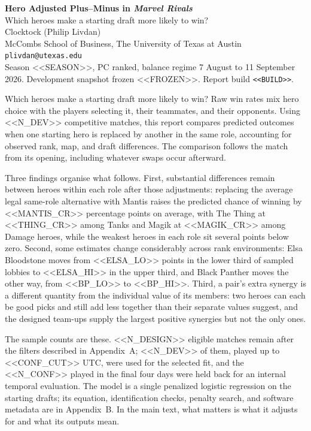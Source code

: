\documentclass[11pt]{article}
\begin{document}
\begin{center}
{\Large\bfseries Hero Adjusted Plus--Minus in \emph{Marvel Rivals}}\\[4pt]
{\large Which heroes make a starting draft more likely to win?}\\[10pt]
{\normalsize Clocktock (Philip Livdan)}\\[2pt]
{\small McCombs School of Business, The University of Texas at Austin}\\
{\small\texttt{plivdan@utexas.edu}}\\[8pt]
{\small Season <<SEASON>>, PC ranked, balance regime 7 August to 11 September 2026. Development snapshot frozen <<FROZEN>>. Report build \texttt{<<BUILD>>}.}
\end{center}

\vspace{6pt}
\noindent Which heroes make a starting draft more likely to win? Raw win rates mix hero choice with the
players selecting it, their teammates, and their opponents. Using <<N_DEV>> competitive matches, this
report compares predicted outcomes when one starting hero is replaced by another in the same role,
accounting for observed rank, map, and draft differences. The comparison follows the match from its
opening, including whatever swaps occur afterward.

Three findings organise what follows. First, substantial differences remain between heroes within each
role after those adjustments: replacing the average legal same-role alternative with Mantis raises the
predicted chance of winning by <<MANTIS_CR>> percentage points on average, with The Thing at <<THING_CR>>
among Tanks and Magik at <<MAGIK_CR>> among Damage heroes, while the weakest heroes in each role sit
several points below zero. Second, some estimates change considerably across rank environments: Elsa
Bloodstone moves from <<ELSA_LO>> points in the lower third of sampled lobbies to <<ELSA_HI>> in the
upper third, and Black Panther moves the other way, from <<BP_LO>> to <<BP_HI>>. Third, a pair's extra
synergy is a different quantity from the individual value of its members: two heroes can each be good
picks and still add less together than their separate values suggest, and the designed team-ups supply
the largest positive synergies but not the only ones.

The sample counts are these. <<N_DESIGN>> eligible matches remain after the filters described in
Appendix~A; <<N_DEV>> of them, played up to <<CONF_CUT>> UTC, were used for the selected fit, and the
<<N_CONF>> played in the final four days were held back for an internal temporal evaluation. The model is a
single penalized logistic regression on the starting drafts; its equation, identification checks,
penalty search, and software metadata are in Appendix~B. In the main text, what matters is what it
adjusts for and what its outputs mean.
\end{document}
